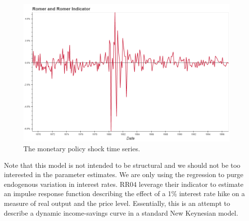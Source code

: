 \documentclass[a4paper,man,floatsintext,natbib]{apa6}
\begin{document}
	\begin{figure}
		\centering
		\includegraphics[width=\textwidth]{charts/rr04.png}
		\caption{\label{rr04} The \cite{Romer2004} monetary policy shock time series.}
	\end{figure}
	Note that this model is not intended to be structural and we should not be too interested in the parameter estimates. We are only using the regression to purge endogenous variation in interest rates. RR04 leverage their indicator to estimate an impulse response function describing the effect of a 1\% interest rate hike on a measure of real output and the price level. Essentially, this is an attempt to describe a dynamic income-savings curve in a standard New Keynesian model. 
	
\end{document}
